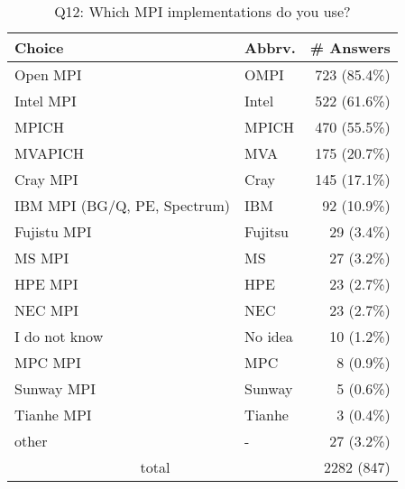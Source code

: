 \begin{table}[htb]%
\begin{center}%
\caption{Q12: Which MPI implementations do you use?}%
\label{tab:Q12-ans}%
\begin{tabular}{l|l|r}%
\hline%
Choice & Abbrv. & \# Answers \\%
\hline%
Open MPI & OMPI & 723 (85.4\%) \\%
Intel MPI & Intel & 522 (61.6\%) \\%
MPICH & MPICH & 470 (55.5\%) \\%
MVAPICH & MVA & 175 (20.7\%) \\%
Cray MPI & Cray & 145 (17.1\%) \\%
IBM MPI (BG/Q, PE, Spectrum) & IBM & 92 (10.9\%) \\%
Fujistu MPI & Fujitsu & 29 (3.4\%) \\%
MS MPI & MS & 27 (3.2\%) \\%
HPE MPI & HPE & 23 (2.7\%) \\%
NEC MPI & NEC & 23 (2.7\%) \\%
I do not know & No idea & 10 (1.2\%) \\%
MPC MPI & MPC & 8 (0.9\%) \\%
Sunway MPI & Sunway & 5 (0.6\%) \\%
Tianhe MPI & Tianhe & 3 (0.4\%) \\%
other & - & 27 (3.2\%) \\%
\hline%
\multicolumn{2}{c}{total} & 2282 (847)\\%
\hline%
\end{tabular}%
\end{center}%
\end{table}%
